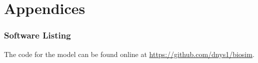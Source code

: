 \part{Appendices}
\appendix
\section{Software Listing}
The code for the model can be found online at \url{https://github.com/dnys1/biosim}.